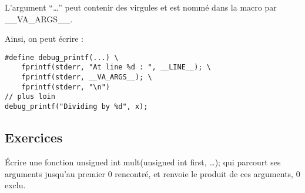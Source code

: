 \documentclass[../../../main.tex]{subfiles}
\begin{document}
L'argument ``\dots'' peut contenir des virgules et est nommé dans la macro par \textsf{\_\_VA\_ARGS\_\_}.

Ainsi, on peut écrire :
\begin{verbatim}
#define debug_printf(...) \
	fprintf(stderr, "At line %d : ", __LINE__); \
	fprintf(stderr, __VA_ARGS__); \
	fprintf(stderr, "\n")
// plus loin
debug_printf("Dividing by %d", x);
\end{verbatim}
\subsection{Exercices}
 Écrire une fonction \textsf{unsigned int mult(unsigned int first, \dots);} qui parcourt ses arguments jusqu'au premier 0 rencontré, et renvoie le produit de ces arguments, 0 exclu.
\end{document}
